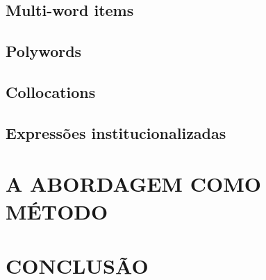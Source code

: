 \subsection{Multi-word items}
\subsection{Polywords}
\subsection{Collocations}
\subsection{Expressões institucionalizadas}

\section{A ABORDAGEM COMO MÉTODO}

\section{CONCLUSÃO}
